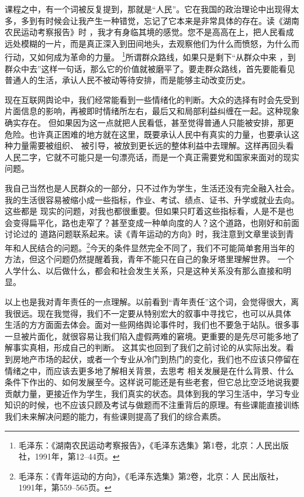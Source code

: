\documentclass[12pt,a4paper]{ctexart}
\begin{document}
{课程之中，有一个词被反复提到，那就是“人民”。它在我国的政治理论中出现得太多，多到有时候会让我产生一种错觉，忘记了它本来是非常具体的存在。读《湖南农民运动考察报告》时
，我才有身临其境的感觉。您不是高高在上，把人民看成远处模糊的一片，而是真正深入到田间地头，去观察他们为什么而愤怒，为什么而行动，又如何成为革命的力量。
\footnote{毛泽东：《湖南农民运动考察报告》，《毛泽东选集》第1卷，北京：人民出版社，1991年，第12--44页。}所谓群众路线，如果只是剩下“从群众中来
，到群众中去”这样一句话，那么它的价值就被磨平了。要走群众路线，首先要能看见普通人的生活，承认人民不被动等待安排，而是能够主动改变历史。

现在互联网舆论中，我们经常能看到一些情绪化的判断。大众的选择有时会先受到片面信息的影响，再被即时情绪所左右，最后又和局部利益纠缠在一起。这种现象确实存在。
但如果因为这一点就把人民看低，甚至觉得普通人只能被安排，那更危险。也许真正困难的地方就在这里，既要承认人民中有真实的力量，也要承认这种力量需要被组织、
被引导，被放到更长远的整体利益中去理解。这样再回头看人民二字，它就不可能只是一句漂亮话，而是一个真正需要党和国家来面对的现实问题。

我自己当然也是人民群众的一部分，只不过作为学生，生活还没有完全融入社会。我的生活很容易被缩小成一些指标，作业、考试、绩点、证书、升学或就业去向。这些都是
现实的问题，对我也都很重要。但如果只盯着这些指标看，人是不是也会变得扁平化，路也走窄了？甚至变成一种单向度的人？这个道路，也刚好和前面讨论过的
道路问题联系起来。读《青年运动的方向》时，我注意到文章里谈到青年和人民结合的问题。\footnote{毛泽东：《青年运动的方向》，《毛泽东选集》第2卷，北京：人
民出版社，1991年，第559--565页。}今天的条件显然完全不同了，我们不可能简单套用当年的方法，但这个问题仍然提醒着我，青年不能只在自己的象牙塔里理解世界。
一个人学什么、以后做什么，都会和社会发生关系，只是这种关系没有那么直接和明显。

以上也是我对青年责任的一点理解。以前看到“青年责任”这个词，会觉得很大，离我很远。现在我觉得，我们不一定要从特别宏大的叙事中寻找它，也可以从具体
生活的方方面面去体会。面对一些网络舆论事件时，我们也不要急于站队。很多事一旦被片面化，就很容易让我们陷入虚假两难的窘境。更重要的是先尽可能多地了解事实真相，形成自己的判断。
这其实也回到了我们之前讨论的从实际出发。看到房地产市场的起伏，或者一个专业从冷门到热门的变化，我们也不应该只停留在情绪之中，而应该去更多地了解相关背景，去思考
相关发展是在什么背景、什么条件下作出的、如何发展至今。这样说可能还是有些老套，但它总比空泛地说我要贡献力量，更接近作为学生，我们真实的状态。具体到我的学习生活中，学习专业知识的时候，也不应该只顾及考试与做题而不注重背后的原理。有些课能直接训练我们未来解决问题的能力，有些课则提高了我们的综合素质。

}
\end{document}
